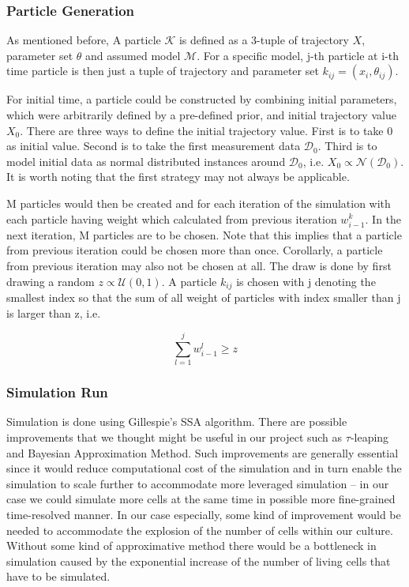 \documentclass{bioinfo}
\begin{document}
\subsubsection{Particle Generation}

As mentioned before, A particle $\mathcal{K}$ is defined as a 3-tuple of trajectory $X$, parameter set $\theta$ and assumed model $\mathcal{M}$. For a specific model, j-th particle at i-th time particle is then just a tuple of trajectory and parameter set $k_{ij} = (x_i, \theta_{ij})$.

For initial time, a particle could be constructed by combining initial parameters, which were arbitrarily defined by a pre-defined prior, and initial trajectory value $X_0$. There are three ways to define the initial trajectory value. First is to take 0 as initial value. Second is to take the first measurement data $\mathcal{D}_0$. Third is to model initial data as normal distributed instances around $\mathcal{D}_0$, i.e. $X_0 \propto \mathcal{N}(\mathcal{D}_0)$. It is worth noting that the first strategy may not always be applicable.

M particles would then be created and for each iteration of the simulation with each particle having weight which calculated from previous iteration $w_{i - 1}^k$. In the next iteration, M particles are to be chosen. Note that this implies that a particle from previous iteration could be chosen more than once. Corollarly, a particle from previous iteration may also not be chosen at all. The draw is done by first drawing a random $z \propto \mathcal{U}(0, 1)$. A particle $k_{ij}$ is chosen with j denoting the smallest index so that the sum of all weight of particles with index smaller than j is larger than z, i.e.

\begin{equation}
\sum_{l=1}^{j} w_{i - 1}^l \geq z\label{eq:14}
\end{equation}

\subsubsection{Simulation Run}

Simulation is done using Gillespie's SSA algorithm. There are possible improvements that we thought might be useful in our project such as $\tau$-leaping and Bayesian Approximation Method. Such improvements are generally essential since it would reduce computational cost of the simulation and in turn enable the simulation to scale further to accommodate more leveraged simulation -- in our case we could simulate more cells at the same time in possible more fine-grained time-resolved manner. In our case especially, some kind of improvement would be needed to accommodate the explosion of the number of cells within our culture. Without some kind of approximative method there would be a bottleneck in simulation caused by the exponential increase of the number of living cells that have to be simulated.\\
\end{document}
